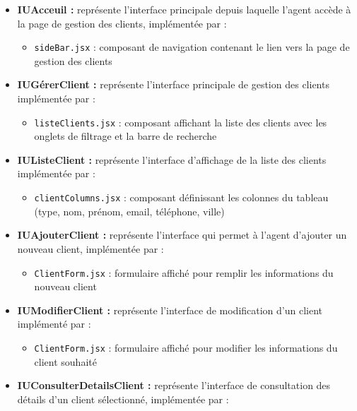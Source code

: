 \begin{itemize}[leftmargin=2em, topsep=4pt, itemsep=4pt]
  \item \textbf{IUAcceuil :} représente l'interface principale depuis laquelle l'agent accède à la page de gestion des clients, implémentée par :
  \begin{itemize}[leftmargin=2em, topsep=2pt, itemsep=2pt]
    \item \texttt{sideBar.jsx} : composant de navigation contenant le lien vers la page de gestion des clients
  \end{itemize}
  \item \textbf{IUGérerClient :} représente l'interface principale de gestion des clients implémentée par :
  \begin{itemize}[leftmargin=2em, topsep=2pt, itemsep=2pt]
    \item \texttt{listeClients.jsx} : composant affichant la liste des clients avec les onglets de filtrage et la barre de recherche
  \end{itemize}
  \item \textbf{IUListeClient :} représente l'interface d'affichage de la liste des clients implémentée par :
  \begin{itemize}[leftmargin=2em, topsep=2pt, itemsep=2pt]
    \item \texttt{clientColumns.jsx} : composant définissant les colonnes du tableau (type, nom, prénom, email, téléphone, ville)
  \end{itemize}
  \item \textbf{IUAjouterClient :} représente l'interface qui permet à l'agent d'ajouter un nouveau client, implémentée par :
  \begin{itemize}[leftmargin=2em, topsep=2pt, itemsep=2pt]
    \item \texttt{ClientForm.jsx} : formulaire affiché pour remplir les informations du nouveau client
  \end{itemize}
  \item \textbf{IUModifierClient :} représente l'interface de modification d'un client implémenté par :
  \begin{itemize}[leftmargin=2em, topsep=2pt, itemsep=2pt]
    \item \texttt{ClientForm.jsx} : formulaire affiché pour modifier les informations du client souhaité
  \end{itemize}
  \item \textbf{IUConsulterDetailsClient :} représente l'interface de consultation des détails d'un client sélectionné, implémentée par :

\end{itemize}
